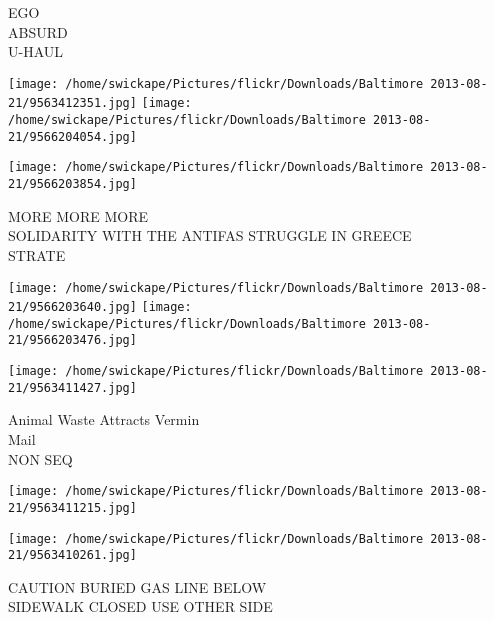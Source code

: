 \documentclass[10pt,letterpaper]{article}
\begin{document}
EGO\\
ABSURD\\
U{-}HAUL\\
\pagebreak

\texttt{[image: /home/swickape/Pictures/flickr/Downloads/Baltimore 2013-08-21/9563412351.jpg]}
\texttt{[image: /home/swickape/Pictures/flickr/Downloads/Baltimore 2013-08-21/9566204054.jpg]}

\vspace{0.25in}
\texttt{[image: /home/swickape/Pictures/flickr/Downloads/Baltimore 2013-08-21/9566203854.jpg]}

MORE MORE MORE\\
SOLIDARITY WITH THE ANTIFAS STRUGGLE IN GREECE\\
STRATE\\
\pagebreak

\texttt{[image: /home/swickape/Pictures/flickr/Downloads/Baltimore 2013-08-21/9566203640.jpg]}
\texttt{[image: /home/swickape/Pictures/flickr/Downloads/Baltimore 2013-08-21/9566203476.jpg]}

\texttt{[image: /home/swickape/Pictures/flickr/Downloads/Baltimore 2013-08-21/9563411427.jpg]}

Animal Waste Attracts Vermin\\
Mail\\
NON SEQ\\
\pagebreak

\texttt{[image: /home/swickape/Pictures/flickr/Downloads/Baltimore 2013-08-21/9563411215.jpg]}

\vspace{0.25in}
\texttt{[image: /home/swickape/Pictures/flickr/Downloads/Baltimore 2013-08-21/9563410261.jpg]}

CAUTION BURIED GAS LINE BELOW\\
SIDEWALK CLOSED USE OTHER SIDE\\
\pagebreak
\end{document}
